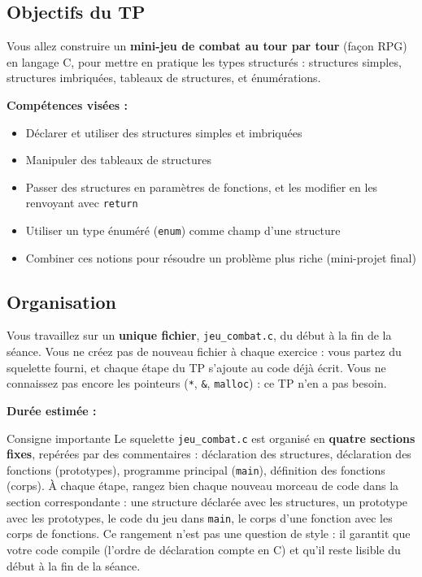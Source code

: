 \subsection*{Objectifs du TP}

Vous allez construire un \textbf{mini-jeu de combat au tour par tour} (façon RPG) en langage C,
pour mettre en pratique les types structurés : structures simples, structures imbriquées,
tableaux de structures, et énumérations.

\textbf{Compétences visées :}
\begin{itemize}
  \item Déclarer et utiliser des structures simples et imbriquées
  \item Manipuler des tableaux de structures
  \item Passer des structures en paramètres de fonctions, et les modifier en les renvoyant
    avec \texttt{return}
  \item Utiliser un type énuméré (\texttt{enum}) comme champ d'une structure
  \item Combiner ces notions pour résoudre un problème plus riche (mini-projet final)
\end{itemize}

\subsection*{Organisation}

Vous travaillez sur un \textbf{unique fichier}, \texttt{jeu\_combat.c}, du début à la fin de la
séance. Vous ne créez pas de nouveau fichier à chaque exercice : vous partez du squelette
fourni, et chaque étape du TP s'ajoute au code déjà écrit. Vous ne connaissez pas encore les
pointeurs (\texttt{*}, \texttt{\&}, \texttt{malloc}) : ce TP n'en a pas besoin.

\textbf{Durée estimée :} \UPSTIduree

\begin{UPSTIinfor}{Consigne importante}
  Le squelette \texttt{jeu\_combat.c} est organisé en \textbf{quatre sections fixes}, repérées
  par des commentaires : déclaration des structures, déclaration des fonctions (prototypes),
  programme principal (\texttt{main}), définition des fonctions (corps). À chaque étape,
  rangez bien chaque nouveau morceau de code dans la section correspondante : une structure
  déclarée avec les structures, un prototype avec les prototypes, le code du jeu dans
  \texttt{main}, le corps d'une fonction avec les corps de fonctions. Ce rangement n'est pas
  une question de style : il garantit que votre code compile (l'ordre de déclaration compte en
  C) et qu'il reste lisible du début à la fin de la séance.
\end{UPSTIinfor}

\pagebreak
